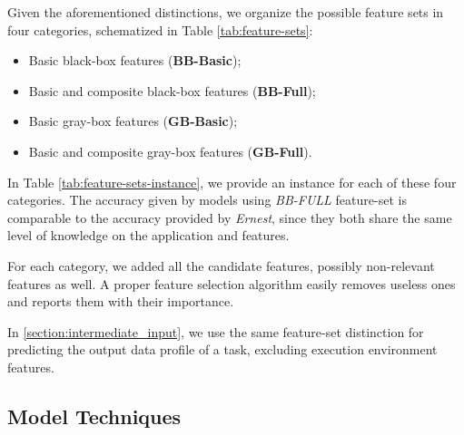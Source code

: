 \documentclass[a4paper, 10pt, conference]{ieeeconf}      %
\begin{document}

\noindent Given the aforementioned distinctions, we organize the possible feature sets in four categories, schematized in Table \ref{tab:feature-sets}: 
\begin{itemize}
    \item Basic black-box features (\textbf{BB-Basic});
    \item Basic and composite black-box features (\textbf{BB-Full});
     \item Basic gray-box features (\textbf{GB-Basic});
    \item Basic and composite gray-box features (\textbf{GB-Full}).
\end{itemize}
In Table \ref{tab:feature-sets-instance}, we provide an instance for each of these four categories. \color{blue}
The accuracy given by models using \textit{BB-FULL} feature-set is comparable to the accuracy provided by \textit{Ernest}, since they both share the same level of knowledge on the application and features.
\color{black}

For each category, we added all the candidate features, possibly non-relevant features as well. A proper feature selection algorithm easily removes useless ones and reports them with their importance.   

In \ref{section:intermediate_input}, we use the same feature-set distinction for predicting the output data profile of a task, excluding execution environment features.

\subsection{Model Techniques}
\end{document}
